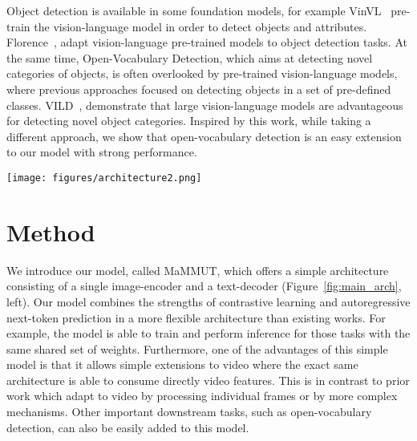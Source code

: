 \documentclass[10pt]{article} \usepackage[accepted]{tmlr}
\newcommand{\ours}{MaMMUT\xspace}
\begin{document}
 Object detection is available in some  foundation models, for example VinVL~\citep{VinVL} pre-train the vision-language model in order to detect objects and attributes. Florence~\citep{yuan2021florence}, adapt vision-language pre-trained models to object detection tasks. At the same time, Open-Vocabulary Detection, which aims at detecting novel categories of objects, is often overlooked by pre-trained vision-language models, where previous approaches focused on detecting objects in a set of pre-defined classes. VILD~\citep{gu2022openvocabulary}, 
demonstrate that large vision-language models are advantageous for detecting novel object categories. Inspired by this work, while taking a different approach, we show that open-vocabulary detection is an easy extension to our model with strong performance. 
\begin{figure*}
    \centering
       \vspace{-0.7cm}
    \texttt{[image: figures/architecture2.png]}
     \vspace{-0.2cm}
    \caption{\ours model architecture with an image encoder and text decoder (left), compared to others. Many encoder-decoder architectures (center) cannot handle the contrastive objective, for example~\citep{pmlr-v139-cho21a,pali}. Approaches to combine contrastive and captioning (right), e.g. Align-Before-Fuse (ALBEF)~\citep{albef} or CoCa~\citep{yu2022coca} develop more complex models and are hard to extend to video inputs or localization tasks.  Our architecture is simpler than previous approaches and is able to accommodate more tasks.}
    \label{fig:main_arch}
    \vspace{-0.4cm}
\end{figure*}

\vspace{-0.1cm}
\section{Method}
\vspace{-0.3cm}
We introduce our model, called \ours, which offers a simple architecture consisting of a single image-encoder and a text-decoder (Figure~\ref{fig:main_arch}, left).
Our model combines the strengths of contrastive learning and autoregressive next-token prediction in a more flexible architecture than existing works. For example, the model is able to train and perform inference for those tasks with the same shared set of weights. 
Furthermore, one of the advantages of this simple model is that it allows simple extensions to video where the exact same architecture is able to consume directly video features. This is in contrast to prior work which adapt to video by processing individual frames or by more complex mechanisms. Other important downstream tasks, such as open-vocabulary detection, can also be easily added to this model. 
\end{document}
